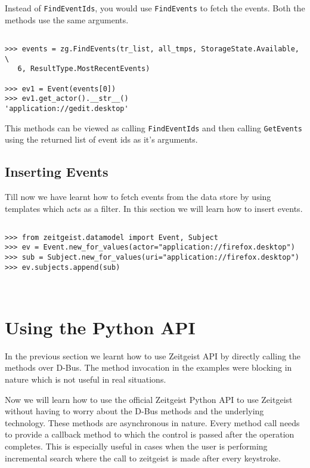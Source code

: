 Instead of \texttt{FindEventIds}, you would use \texttt{FindEvents} to fetch 
the events. Both the methods use the same arguments.

\begin{center}
\begin{verbatim}

>>> events = zg.FindEvents(tr_list, all_tmps, StorageState.Available, \
   6, ResultType.MostRecentEvents)

>>> ev1 = Event(events[0])
>>> ev1.get_actor().__str__()
'application://gedit.desktop'

\end{verbatim}
\end{center}

This methods can be viewed as calling \texttt{FindEventIds} and then calling 
\texttt{GetEvents} using the returned list of event ids as it's arguments.

\subsection{Inserting Events}

Till now we have learnt how to fetch events from the data store by using templates 
which acts as a filter. In this section we will learn how to insert events.

\begin{center}
\begin{verbatim}

>>> from zeitgeist.datamodel import Event, Subject
>>> ev = Event.new_for_values(actor="application://firefox.desktop")
>>> sub = Subject.new_for_values(uri="application://firefox.desktop")
>>> ev.subjects.append(sub)



\end{verbatim}
\end{center}

\section{Using the Python API}

In the previous section we learnt how to use Zeitgeist API by directly calling 
the methods over D-Bus. The method invocation in the examples were blocking in nature 
which is not useful in real situations. 

Now we will learn how to use the official Zeitgeist Python API to use Zeitgeist 
without having to worry about the D-Bus methods and the underlying technology. These 
methods are asynchronous in nature. Every method call needs to provide a callback 
method to which the control is passed after the operation completes. This is 
especially useful in cases when the user is performing incremental search where 
the call to zeitgeist is made after every keystroke.

